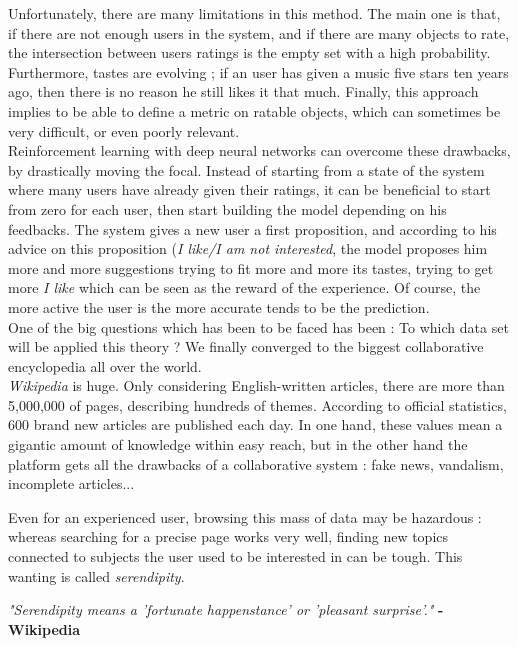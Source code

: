 \documentclass[11pt]{article}
\theoremstyle{plain}
\theoremstyle{definition}
\theoremstyle{remark}
\begin{document}
Unfortunately, there are many limitations in this method. The main one is that, if there are not enough users in the system, and if there are many objects to rate, the intersection between users ratings is the empty set with a high probability. Furthermore, tastes are evolving ; if an user has given a music five stars ten years ago, then there is no reason he still likes it that much. Finally, this approach implies to be able to define a metric on ratable objects, which can sometimes be very difficult, or even poorly relevant. \\

Reinforcement learning with deep neural networks can overcome these drawbacks, by drastically moving the focal. Instead of starting from a state of the system where many users have already given their ratings, it can be beneficial to start from zero for each user, then start building the model depending on his feedbacks. The system gives a new user a first proposition, and according to his advice on this proposition (\textit{I like/I am not interested}, the model proposes him more and more suggestions trying to fit more and more its tastes, trying to get more \textit{I like} which can be seen as the reward of the experience. Of course, the more active the user is the more accurate tends to be the prediction. \\

One of the big questions which has been to be faced has been : To which data set will be applied this theory ? We finally converged to the biggest collaborative encyclopedia all over the world. \\

\textit{Wikipedia} is huge. Only considering English-written articles, there are more than 5,000,000 of pages, describing hundreds of themes. According to official statistics, 600 brand new articles are published each day. In one hand, these values mean a gigantic amount of knowledge within easy reach, but in the other hand the platform gets all the drawbacks of a collaborative system : fake news, vandalism, incomplete articles... 

Even for an experienced user, browsing this mass of data may be hazardous : whereas searching for a precise page works very well, finding new topics connected to subjects the user used to be interested in can be tough. This wanting is called \textit{serendipity}. 

\begin{center}
\textit{"Serendipity means a 'fortunate happenstance' or 'pleasant surprise'." } \textbf{- Wikipedia}
\end{center}
\end{document}
